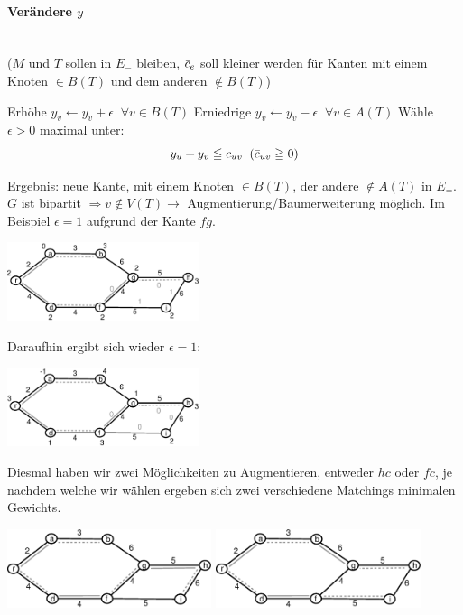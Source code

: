 \paragraph{Verändere $y$} \mbox{} \\
($M$ und $T$ sollen in $E_{=}$ bleiben, $\bar{c}_e$ soll kleiner werden für
Kanten mit einem Knoten $\in B(T)$ und dem anderen $\not\in
B(T)$)
\begin{algorithmic}
\STATE Erhöhe $y_{v} \leftarrow y_v + \epsilon \; \; \forall v \in B(T)$
\STATE Erniedrige $y_v \leftarrow y_v - \epsilon \; \; \forall v \in A(T)$
\STATE Wähle $\epsilon > 0$ maximal unter:
\[y_u + y_v \leqq c_{u v} \; \; (\bar{c}_{u v} \geqq 0)\]
\end{algorithmic}
Ergebnis: neue Kante, mit einem Knoten $\in B(T)$, der andere $\not\in
A(T)$ in $E_{=}$.\\
$G$ ist bipartit $\Rightarrow v \not\in V(T) \rightarrow$
Augmentierung/Baumerweiterung möglich. Im Beispiel $\epsilon =1$ aufgrund
der Kante $f g$.

\includegraphics[height=2.3cm]{bilder/5-3StartMax2}

Daraufhin ergibt sich wieder $\epsilon = 1$:

\includegraphics[height=2.3cm]{bilder/5-3StartMax3}

Diesmal haben wir zwei Möglichkeiten zu Augmentieren, entweder $h c$ oder
$f c$, je nachdem welche wir wählen ergeben sich zwei verschiedene
Matchings minimalen Gewichts.

\includegraphics[height=2.3cm]{bilder/5-3StartMax4_1} \hspace{5mm}
\includegraphics[height=2.3cm]{bilder/5-3StartMax4_2}

